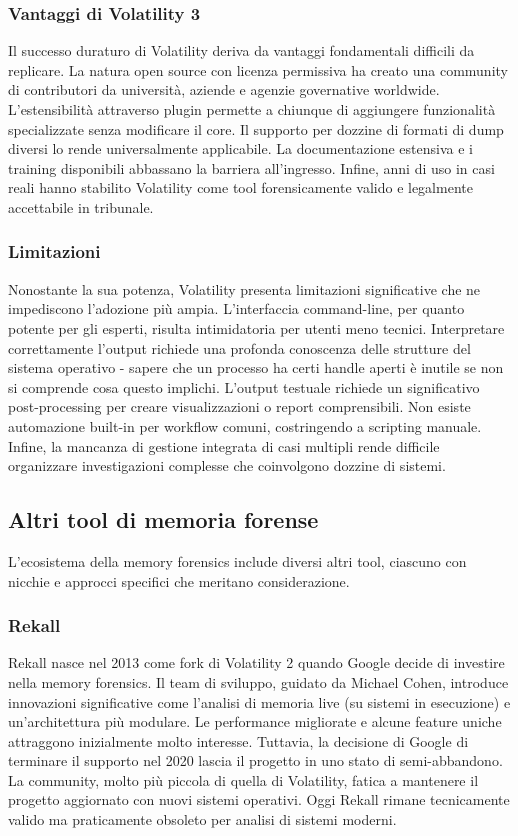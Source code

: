 \subsubsection{Vantaggi di Volatility 3}
Il successo duraturo di Volatility deriva da vantaggi fondamentali difficili da replicare. La natura open source con licenza permissiva ha creato una community di contributori da università, aziende e agenzie governative worldwide. L'estensibilità attraverso plugin permette a chiunque di aggiungere funzionalità specializzate senza modificare il core. Il supporto per dozzine di formati di dump diversi lo rende universalmente applicabile. La documentazione estensiva e i training disponibili abbassano la barriera all'ingresso. Infine, anni di uso in casi reali hanno stabilito Volatility come tool forensicamente valido e legalmente accettabile in tribunale.

\subsubsection{Limitazioni}
Nonostante la sua potenza, Volatility presenta limitazioni significative che ne impediscono l'adozione più ampia. L'interfaccia command-line, per quanto potente per gli esperti, risulta intimidatoria per utenti meno tecnici. Interpretare correttamente l'output richiede una profonda conoscenza delle strutture del sistema operativo - sapere che un processo ha certi handle aperti è inutile se non si comprende cosa questo implichi. L'output testuale richiede un significativo post-processing per creare visualizzazioni o report comprensibili. Non esiste automazione built-in per workflow comuni, costringendo a scripting manuale. Infine, la mancanza di gestione integrata di casi multipli rende difficile organizzare investigazioni complesse che coinvolgono dozzine di sistemi.

\subsection{Altri tool di memoria forense}

L'ecosistema della memory forensics include diversi altri tool, ciascuno con nicchie e approcci specifici che meritano considerazione.

\subsubsection{Rekall}
Rekall nasce nel 2013 come fork di Volatility 2 quando Google decide di investire nella memory forensics. Il team di sviluppo, guidato da Michael Cohen, introduce innovazioni significative come l'analisi di memoria live (su sistemi in esecuzione) e un'architettura più modulare. Le performance migliorate e alcune feature uniche attraggono inizialmente molto interesse. Tuttavia, la decisione di Google di terminare il supporto nel 2020 lascia il progetto in uno stato di semi-abbandono. La community, molto più piccola di quella di Volatility, fatica a mantenere il progetto aggiornato con nuovi sistemi operativi. Oggi Rekall rimane tecnicamente valido ma praticamente obsoleto per analisi di sistemi moderni.

